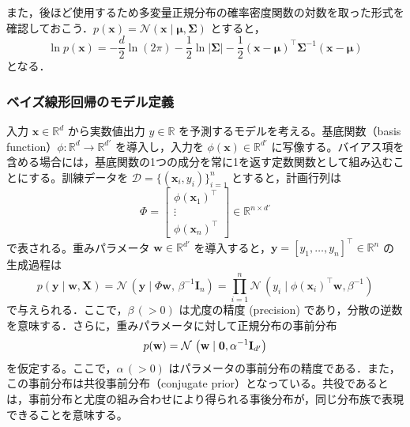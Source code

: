 \documentclass[titlepage]{ltjsbook}
\begin{document}
また，後ほど使用するため多変量正規分布の確率密度関数の対数を取った形式を確認しておこう．$p(\mathbf{x})=\mathcal{N}(\mathbf{x} \mid \boldsymbol{\mu}, \boldsymbol{\Sigma}) $ とすると，
\begin{equation}
\ln p(\mathbf{x}) = -\frac{d}{2} \ln (2\pi) - \frac{1}{2} \ln \lvert\boldsymbol{\Sigma}\rvert - \frac{1}{2}(\mathbf{x} - \boldsymbol{\mu})^\top \boldsymbol{\Sigma}^{-1} (\mathbf{x} - \boldsymbol{\mu})
\end{equation}
となる．

\subsubsection{ベイズ線形回帰のモデル定義}
入力 $\mathbf{x} \in \mathbb{R}^d$ から実数値出力 $y \in \mathbb{R}$ を予測するモデルを考える。基底関数（basis function）$\phi:\mathbb{R}^d \to \mathbb{R}^{d'}$ を導入し，入力を $\phi(\mathbf{x}) \in \mathbb{R}^{d'}$ に写像する。バイアス項を含める場合には，基底関数の1つの成分を常に1を返す定数関数として組み込むことにする。訓練データを $\mathcal{D}=\{(\mathbf{x}_i, y_i)\}_{i=1}^n$ とすると，計画行列は
\begin{equation}
\Phi = 
\begin{bmatrix}
\phi(\mathbf{x}_1)^\top \\
\vdots \\
\phi(\mathbf{x}_n)^\top
\end{bmatrix}
\in \mathbb{R}^{n\times d'}
\end{equation}
で表される。重みパラメータ $\mathbf{w}\in\mathbb{R}^{d'}$ を導入すると，$\mathbf{y}=[y_1,\dots,y_n]^\top \in \mathbb{R}^n$ の生成過程は
\begin{equation}
p(\mathbf{y}\mid \mathbf{w},\mathbf{X})
=\mathcal{N}\,\left(\mathbf{y}\mid \Phi \mathbf{w},\,\beta^{-1}\mathbf{I}_n\right)
= \prod_{i=1}^n \mathcal{N}\,\left(y_i\mid \phi(\mathbf{x}_i)^\top\mathbf{w} , \beta^{-1}\right)
\end{equation}
で与えられる．ここで，$\beta\,(>0)$ は尤度の精度 (precision) であり，分散の逆数を意味する．さらに，重みパラメータに対して正規分布の事前分布
\begin{equation}
p(\mathbf{w})=\mathcal{N}\,\left(\mathbf{w}\mid \mathbf{0},\alpha^{-1} \mathbf{I}_{d'}\\\right)
\end{equation}
を仮定する。ここで，$\alpha\,(>0)$ はパラメータの事前分布の精度である．また，この事前分布は共役事前分布（conjugate prior）となっている。共役であるとは，事前分布と尤度の組み合わせにより得られる事後分布が，同じ分布族で表現できることを意味する。
\end{document}
